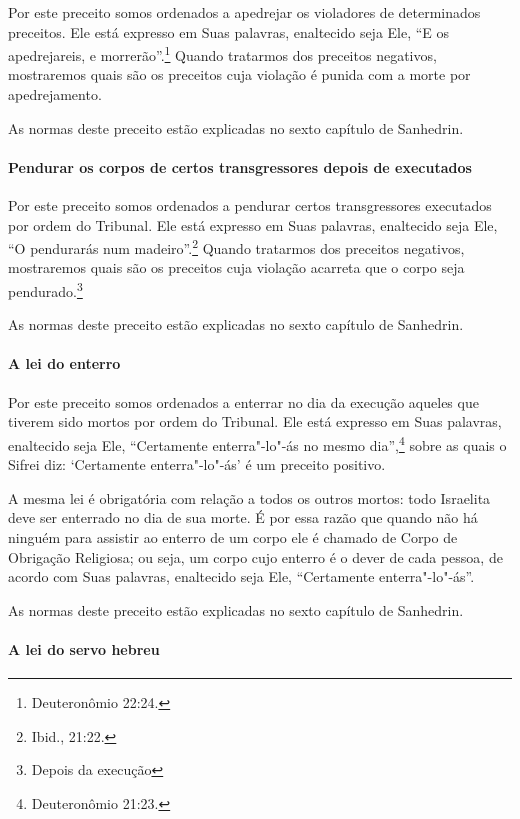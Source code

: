 \begin{multicols}{2}
Por este preceito somos ordenados a apedrejar os violadores de
determinados preceitos. Ele está expresso em Suas palavras, enaltecido
seja Ele, ``E os apedrejareis, e morrerão''.\footnote{Deuteronômio 22:24.} Quando
tratarmos dos preceitos negativos, mostraremos quais são os preceitos
cuja violação é punida com a morte por apedrejamento.

As normas deste preceito estão explicadas no sexto capítulo de Sanhedrin\starr.


\paragraph{Pendurar os corpos de certos transgressores depois de executados}

Por este preceito somos ordenados a pendurar certos transgressores
executados por ordem do Tribunal. Ele está expresso em Suas palavras,
enaltecido seja Ele, ``O pendurarás num madeiro''.\footnote{Ibid., 21:22.}
Quando tratarmos dos preceitos negativos, mostraremos quais são os
preceitos cuja violação acarreta que o corpo seja
pendurado.\footnote{Depois da execução}

As normas deste preceito estão explicadas no sexto capítulo de Sanhedrin\starr.

\paragraph{A lei do enterro}

Por este preceito somos ordenados a enterrar no dia da execução aqueles
que tiverem sido mortos por ordem do Tribunal. Ele está expresso em Suas
palavras, enaltecido seja Ele, ``Certamente enterra"-lo"-ás no mesmo dia'',\footnote{Deuteronômio 21:23.} sobre as quais o Sifrei\starr{} diz: `Certamente
enterra"-lo"-ás' é um preceito positivo.

A mesma lei é obrigatória com relação a todos os outros mortos: todo
Israelita deve ser enterrado no dia de sua morte. É por essa razão que
quando não há ninguém para assistir ao enterro de um corpo ele é
chamado de Corpo de Obrigação Religiosa; ou seja, um corpo cujo enterro
é o dever de cada pessoa, de acordo com Suas palavras, enaltecido seja
Ele, ``Certamente enterra"-lo"-ás''.

As normas deste preceito estão explicadas no sexto capítulo de Sanhedrin\starr.

\paragraph{A lei do servo hebreu}


\end{multicols}
